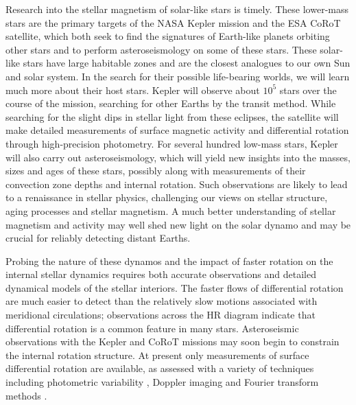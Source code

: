 \clearpage
Research into the stellar magnetism of solar-like stars is timely. 
These lower-mass stars are the primary targets of the NASA Kepler
mission and the ESA CoRoT satellite, which both seek to find the
signatures of Earth-like planets orbiting other stars and to perform
asteroseismology on some of these stars.  These
solar-like stars have large habitable zones and are
the closest analogues to our own Sun and solar system.  In the search for their
possible life-bearing worlds, we will learn much more about their host
stars.  Kepler will observe about $10^5$ stars over the course of
the mission, searching for other Earths by the transit method. While
searching for the slight dips in stellar light from these eclipses, the
satellite will make detailed measurements of surface magnetic
activity and differential rotation through high-precision photometry.
For several hundred low-mass stars, Kepler will also carry out
asteroseismology, which will yield new insights into the masses,
sizes and ages of these stars, possibly along with measurements of
their convection zone depths and internal rotation.  Such observations
are likely to lead to a renaissance in stellar physics, challenging our views on
stellar structure, aging processes and stellar magnetism.  A much better understanding
of stellar magnetism and activity may well shed new light on the solar
dynamo and may be crucial for reliably detecting distant Earths.


Probing the nature of these dynamos and the impact of faster rotation on the internal stellar
dynamics requires both accurate observations and detailed dynamical models of
the stellar interiors.  The faster flows of differential rotation are
much easier to detect than the relatively slow motions associated with
meridional circulations; observations across the HR diagram
indicate that differential rotation is a common feature in many stars.
Asteroseismic observations with the Kepler and CoRoT missions may soon begin to
constrain the internal rotation structure.  At present only
measurements of surface differential rotation are available, as assessed
with a variety of techniques including photometric
variability \citep{Donahue_et_al_1996, Walker_et_al_2007}, Doppler
imaging \citep{Donati_et_al_2003} and Fourier transform methods
\citep{Reiners&Schmitt_2003}. 


